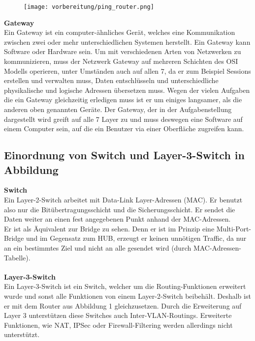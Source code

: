     \begin{figure}[ht]
        \centering
        \texttt{[image: vorbereitung/ping\_router.png]}
    \end{figure}
    \vspace{0cm}
    \textbf{Gateway}
    \\
    Ein Gateway ist ein computer-ähnliches Gerät, welches eine Kommunikation zwischen zwei oder mehr unterschiedlichen Systemen herstellt. Ein Gateway kann Software oder Hardware sein. Um mit verschiedenen Arten von Netzwerken zu kommunizieren, muss der Netzwerk Gateway auf mehreren Schichten des OSI Modells operieren, unter Umständen auch auf allen 7, da er zum Beispiel Sessions erstellen und verwalten muss, Daten entschlüsseln und unterschiedliche physikalische und logische Adressen übersetzen muss. Wegen der vielen Aufgaben die ein Gateway gleichzeitig erledigen muss ist er um einiges langsamer, als die anderen oben genannten Geräte. Der Gateway, der in der Aufgabenstellung dargestellt wird greift auf alle 7 Layer zu und muss deswegen eine Software auf einem Computer sein, auf die ein Benutzer via einer Oberfläche zugreifen kann.\\

\subsection{Einordnung von Switch und Layer-3-Switch in Abbildung}

    \textbf{Switch}
    \\
    Ein Layer-2-Switch arbeitet mit Data-Link Layer-Adressen (MAC). Er benutzt also nur die Bitübertragungsschicht und die Sicherungsschicht. Er sendet die Daten weiter an einen fest angegebenen Punkt anhand der MAC-Adressen. \\
    Er ist als Äquivalent zur Bridge zu sehen. Denn er ist im Prinzip eine Multi-Port-Bridge und im Gegensatz zum HUB, erzeugt er keinen unnötigen Traffic, da nur an ein bestimmtes Ziel und nicht an alle gesendet wird (durch MAC-Adressen-Tabelle).\\
    \\
    \textbf{Layer-3-Switch}
    \\
    Ein Layer-3-Switch ist ein Switch, welcher um die Routing-Funktionen erweitert wurde und sonst alle Funktionen von einem Layer-2-Switch beibehält. Deshalb ist er mit dem Router aus Abbildung 1 gleichzusetzen. Durch die Erweiterung auf Layer 3 unterstützen diese Switches auch Inter-VLAN-Routings. Erweiterte Funktionen, wie NAT, IPSec oder Firewall-Filtering werden allerdings nicht unterstützt.




